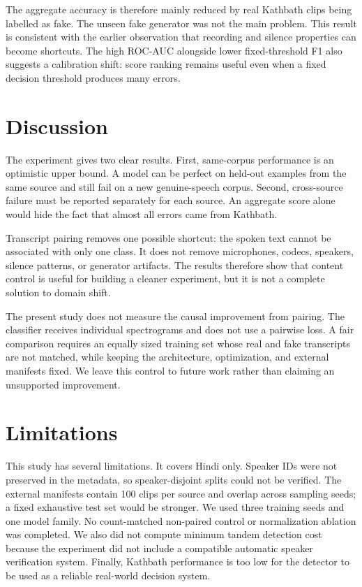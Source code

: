 \documentclass[conference]{IEEEtran}
\begin{document}
The aggregate accuracy is therefore mainly reduced by real Kathbath clips
being labelled as fake. The unseen fake generator was not the main problem.
This result is consistent with the earlier observation that recording and
silence properties can become shortcuts. The high ROC-AUC alongside lower
fixed-threshold F1 also suggests a calibration shift: score ranking remains
useful even when a fixed decision threshold produces many errors.

\section{Discussion}
The experiment gives two clear results. First, same-corpus performance is an
optimistic upper bound. A model can be perfect on held-out examples from the
same source and still fail on a new genuine-speech corpus. Second,
cross-source failure must be reported separately for each source. An
aggregate score alone would hide the fact that almost all errors came from
Kathbath.

Transcript pairing removes one possible shortcut: the spoken text cannot be
associated with only one class. It does not remove microphones, codecs,
speakers, silence patterns, or generator artifacts. The results therefore
show that content control is useful for building a cleaner experiment, but
it is not a complete solution to domain shift.

The present study does not measure the causal improvement from pairing. The
classifier receives individual spectrograms and does not use a pairwise loss.
A fair comparison requires an equally sized training set whose real and fake
transcripts are not matched, while keeping the architecture, optimization,
and external manifests fixed. We leave this control to future work rather
than claiming an unsupported improvement.

\section{Limitations}
This study has several limitations. It covers Hindi only. Speaker IDs were
not preserved in the metadata, so speaker-disjoint splits could not be
verified. The external manifests contain 100 clips per source and overlap
across sampling seeds; a fixed exhaustive test set would be stronger. We
used three training seeds and one model family. No count-matched non-paired
control or normalization ablation was completed. We also did not compute
minimum tandem detection cost because the experiment did not include a
compatible automatic speaker verification system. Finally, Kathbath
performance is too low for the detector to be used as a reliable real-world
decision system.
\end{document}
